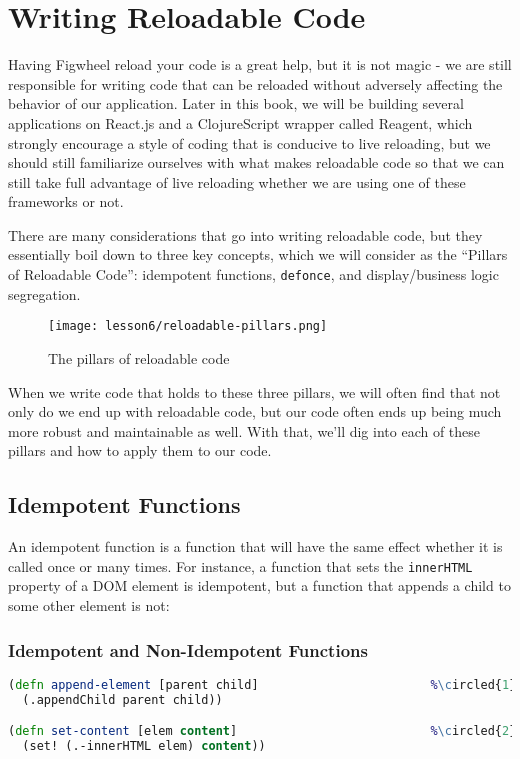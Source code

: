 \documentclass[10pt,twoside,openright]{memoir}
\newcommand*\circled[1]{\tikz[baseline=(char.base)]{
            \node[shape=circle,draw,inner sep=1pt] (char) {#1};}}
\begin{document}
\section{Writing Reloadable Code}

Having Figwheel reload your code is a great help, but it is not magic -
we are still responsible for writing code that can be reloaded without
adversely affecting the behavior of our application. Later in this book,
we will be building several applications on React.js and a ClojureScript
wrapper called Reagent, which strongly encourage a style of coding that
is conducive to live reloading, but we should still familiarize
ourselves with what makes reloadable code so that we can still take full
advantage of live reloading whether we are using one of these frameworks
or not.

There are many considerations that go into writing reloadable code, but
they essentially boil down to three key concepts, which we will consider
as the ``Pillars of Reloadable Code'': idempotent functions,
\texttt{defonce}, and display/business logic segregation.

\begin{figure}[H]
\caption{The pillars of reloadable code}
\centering
\texttt{[image: lesson6/reloadable-pillars.png]}
\end{figure}

When we write code that holds to these three pillars, we will often find
that not only do we end up with reloadable code, but our code often ends
up being much more robust and maintainable as well. With that, we'll dig
into each of these pillars and how to apply them to our code.

\subsection{Idempotent Functions}

An idempotent function is a function that will have the same effect
whether it is called once or many times. For instance, a function that
sets the \texttt{innerHTML} property of a DOM element is idempotent, but
a function that appends a child to some other element is not:

\subsubsection{Idempotent and Non-Idempotent Functions}

\begin{lstlisting}[language=Clojure]
(defn append-element [parent child]                        %\circled{1}%
  (.appendChild parent child))

(defn set-content [elem content]                           %\circled{2}%
  (set! (.-innerHTML elem) content))
\end{lstlisting}
\end{document}
